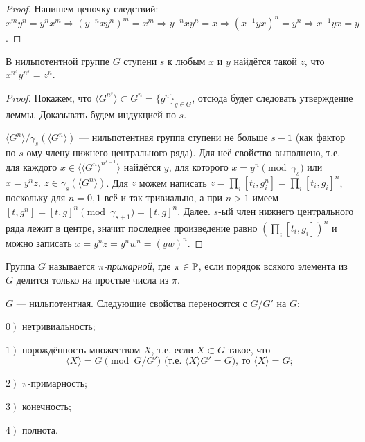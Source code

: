 \documentclass[10pt,a4paper,draft]{article}
\begin{document}
\begin{proof} Напишем цепочку следствий: $x^my^n=y^nx^m\Rightarrow
(y^{-n}xy^n)^m=x^m\Rightarrow y^{-n}xy^n=x\Rightarrow
(x^{-1}yx)^n=y^n\Rightarrow x^{-1}yx=y$. \end{proof}

\begin{theorem}В нильпотентной группе $G$ ступени $s$ к любым $x$ и
$y$ найдётся такой $z$, что $x^{n^s}y^{n^s}=z^n$.
\end{theorem}

\begin{proof} Покажем, что $\langle G^{n^s}\rangle\subset
G^n=\{g^n\}_{g\in G}$, отсюда будет следовать утверждение леммы.
Доказывать будем индукцией по $s$.

$\langle G^n\rangle/\gamma_s(\langle G^n\rangle)$ ---
нильпотентная группа ступени не больше $s-1$ (как фактор по
$s$-ому члену нижнего центрального ряда). Для неё свойство
выполнено, т.е. для каждого $x\in\langle\!\langle
G^n\rangle^{n^{s-1}}\rangle$ найдётся $y$, для которого
$x=y^n\pmod{\gamma_s}$ или $x=y^nz,~z\in\gamma_s(\langle
G^n\rangle)$. Для $z$ можем написать
$z=\prod\limits_i[t_i,g_i^n]=\prod\limits_i[t_i,g_i]^n$, поскольку
для $n=0,1$ всё и так тривиально, а при $n>1$ имеем
$[t,g^n]=[t,g]^n\pmod{\gamma_{s+1}}=[t,g]^n$. Далее. $s$-ый член
нижнего центрального ряда лежит в центре, значит последнее
произведение равно $(\prod\limits_i[t_i,g_i])^n$ и можно записать
$x=y^nz=y^nw^n=(yw)^n$.\end{proof}

Группа $G$ называется {\em
$\pi$-примарной}, где $\pi\in\mathbb P$,
если порядок всякого элемента из $G$ делится только на простые
числа из $\pi$.

\begin{theorem}
$G$ --- нильпотентная. Следующие свойства переносятся с $G/G'$ на
$G$:
\par $\left.0\right)$ нетривиальность;
\par $\left.1\right)$ порождённость множеством $X$, т.е. если
$X\subset G$ такое, что
$$
\langle X\rangle=G\pmod{G/G'}\mbox{ (т.е. }\langle
X\rangle G'=G\mbox{), то }\langle X\rangle =G;
$$
\par $\left.2\right)$ $\pi$-примарность;
\par $\left.3\right)$ конечность;
\par $\left.4\right)$ полнота.
\label{from quotient to group}
\end{theorem}
\end{document}

